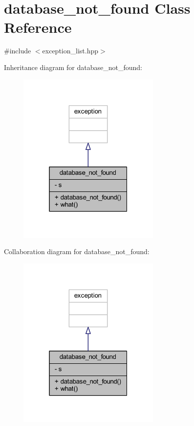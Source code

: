 \hypertarget{classdatabase__not__found}{}\section{database\+\_\+not\+\_\+found Class Reference}
\label{classdatabase__not__found}


{\ttfamily \#include $<$exception\+\_\+list.\+hpp$>$}



Inheritance diagram for database\+\_\+not\+\_\+found\+:
\nopagebreak
\begin{figure}[H]
\begin{center}
\leavevmode
\includegraphics[width=199pt]{classdatabase__not__found__inherit__graph}
\end{center}
\end{figure}


Collaboration diagram for database\+\_\+not\+\_\+found\+:
\nopagebreak
\begin{figure}[H]
\begin{center}
\leavevmode
\includegraphics[width=199pt]{classdatabase__not__found__coll__graph}
\end{center}
\end{figure}
